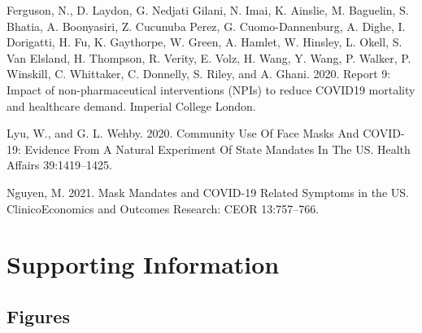 \documentclass[
  12pt,
]{article}
\newlength{\cslhangindent}
\newlength{\cslentryspacingunit} %
\newenvironment{CSLReferences}[2] %
 {%
  \setlength{\parindent}{0pt}
  \ifodd #1
  \let\oldpar\par
  \def\par{\hangindent=\cslhangindent\oldpar}
  \fi
  \setlength{\parskip}{#2\cslentryspacingunit}
 }%
 {}
\begin{document}
\hypertarget{refs}{}
\begin{CSLReferences}{1}{0}
\leavevmode{}%
Ferguson, N., D. Laydon, G. Nedjati Gilani, N. Imai, K. Ainslie, M. Baguelin, S. Bhatia, A. Boonyasiri, Z. Cucunuba Perez, G. Cuomo-Dannenburg, A. Dighe, I. Dorigatti, H. Fu, K. Gaythorpe, W. Green, A. Hamlet, W. Hinsley, L. Okell, S. Van Elsland, H. Thompson, R. Verity, E. Volz, H. Wang, Y. Wang, P. Walker, P. Winskill, C. Whittaker, C. Donnelly, S. Riley, and A. Ghani. 2020. Report 9: {Impact} of non-pharmaceutical interventions ({NPIs}) to reduce {COVID19} mortality and healthcare demand. Imperial College London.

\leavevmode{}%
Lyu, W., and G. L. Wehby. 2020. Community {Use} {Of} {Face} {Masks} {And} {COVID}-19: {Evidence} {From} {A} {Natural} {Experiment} {Of} {State} {Mandates} {In} {The} {US}. Health Affairs 39:1419--1425.

\leavevmode{}%
Nguyen, M. 2021. Mask {Mandates} and {COVID}-19 {Related} {Symptoms} in the {US}. ClinicoEconomics and Outcomes Research: CEOR 13:757--766.

\end{CSLReferences}

\clearpage

\setcounter{page}{0}
\setcounter{page}{1}

\setcounter{figure}{0}
\setcounter{table}{0}
\renewcommand {\thetable}{S\arabic{table}}
\renewcommand {\thefigure}{S\arabic{figure}}

\hypertarget{supporting-information}{%
\section{Supporting Information}\label{supporting-information}}

\hypertarget{figures-1}{%
\subsection{Figures}\label{figures-1}}
\end{document}
